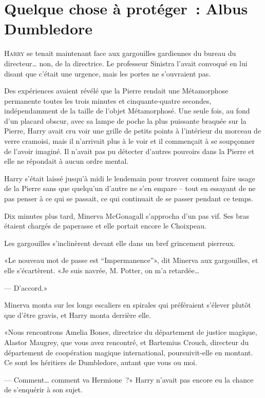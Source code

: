 \chapter{Quelque chose à protéger~: Albus Dumbledore}

\lettrine{H}{arry} se tenait maintenant face aux gargouilles gardiennes du bureau du directeur… non, de la directrice. Le professeur Sinistra l'avait convoqué en lui disant que c'était une urgence, mais les portes ne s'ouvraient pas.

Des expériences avaient révélé que la Pierre rendait une Métamorphose permanente toutes les trois minutes et cinquante-quatre secondes, indépendamment de la taille de l'objet Métamorphosé. Une seule fois, au fond d'un placard obscur, avec sa lampe de poche la plus puissante braquée sur la Pierre, Harry avait cru voir une grille de petits points à l'intérieur du morceau de verre cramoisi, mais il n'arrivait plus à le voir et il commençait à se soupçonner de l'avoir imaginé. Il n'avait pas pu détecter d'autres pouvoirs dans la Pierre et elle ne répondait à aucun ordre mental.

Harry s'était laissé jusqu'à midi le lendemain pour trouver comment faire usage de la Pierre sans que quelqu'un d'autre ne s'en empare -- tout en essayant de ne pas penser à ce qui se passait, ce qui continuait de se passer pendant ce temps.

Dix minutes plus tard, Minerva McGonagall s'approcha d'un pas vif. Ses bras étaient chargés de paperasse et elle portait encore le Choixpeau.

Les gargouilles s'inclinèrent devant elle dans un bref grincement pierreux.

«Le nouveau mot de passe est “Impermanence”», dit Minerva aux gargouilles, et elle s'écartèrent. «Je suis navrée, M. Potter, on m'a retardée…

--- D'accord.»

Minerva monta sur les longs escaliers en spirales qui préféraient s'élever plutôt que d'être gravis, et Harry monta derrière elle.

«Nous rencontrons Amelia Bones, directrice du département de justice magique, Alastor Maugrey, que vous avez rencontré, et Bartemius Crouch, directeur du département de coopération magique international, poursuivit-elle en montant. Ce sont les héritiers de Dumbledore, autant que vous ou moi.

--- Comment… comment va Hermione~?» Harry n'avait pas encore eu la chance de s'enquérir à son sujet.

